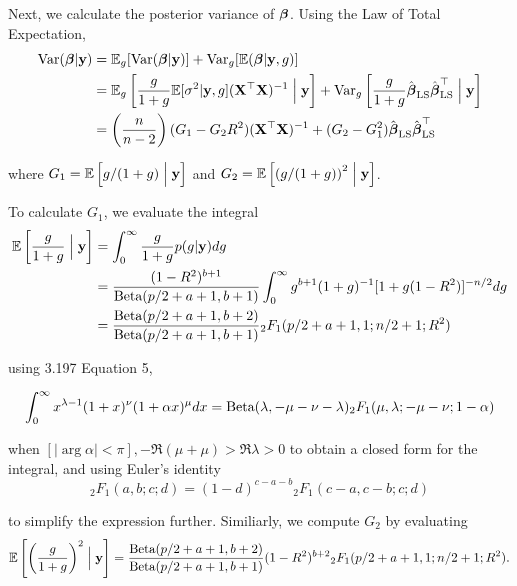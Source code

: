 \documentclass{amsart}[12pt]
\begin{document}
Next, we calculate the posterior variance of ${\boldsymbol \beta}$. Using the Law of Total Expectation,
\begin{align*}
	\text{Var}({\boldsymbol \beta} | {\bf y}) & = \mathbb{E}_g[\text{Var}({\boldsymbol \beta} | {\bf y})] + \text{Var}_g[\mathbb{E}({\boldsymbol \beta}|{\bf y}, g)]                                                                                                                                                 \\
	                   & = \mathbb{E}_g\left[\frac{g}{1 + g} \mathbb{E}[\sigma^2|{\bf y}, g] ({\bf X}^\top {\bf X})^{-1} \Bigm| {\bf y} \right] + \text{Var}_g\left[\frac{g}{1 + g} \hat{{\boldsymbol \beta}}_{\text{LS}} \hat{{\boldsymbol \beta}}_{\text{LS}}^\top \Bigm| {\bf y} \right]                                   \\
	                   & = \left( \frac{n}{n - 2} \right) (G_1 - G_2 R^2) ({\bf X}^\top {\bf X})^{-1} + (G_2 - G_1^2) \hat{{\boldsymbol \beta}}_{\text{LS}} \hat{{\boldsymbol \beta}}_{\text{LS}}^\top                                                                                      
\end{align*}

\noindent where $G_1 = \mathbb{E}\left[g/(1+g) \Bigm| {\bf y} \right]$ and $G_2 = \mathbb{E}\left[ \left(g/(1+g) \right)^2 \Bigm| {\bf y} \right]$.

\noindent To calculate $G_1$, we evaluate the integral
\begin{align*}
	\mathbb{E}\left[\frac{g}{1 + g} \Bigm| {\bf y} \right] & = \int_0^\infty \frac{g}{1 + g} p(g | {\bf y}) dg                                                                      \\
	                                           & = \frac{(1 - R^2)^{b+1}}{\text{Beta}(p/2 + a + 1, b + 1)} \int_0^\infty g^{b+1} (1 + g)^{-1} [1 + g (1 - R^2)]^{-n/2} dg \\
	                                           & = \frac{\text{Beta}(p/2 + a + 1, b + 2)}{\text{Beta}(p /2 + a + 1, b + 1)} {}_2 F_1(p/2 + a + 1, 1; n/2 + 1; R^2)              
\end{align*}

\noindent using \citep{Gradshteyn1988} 3.197 Equation 5,

\[
	\int_0^\infty x^{\lambda-1} (1+x)^\nu (1 + \alpha x)^{\mu} dx = \text{Beta}(\lambda, -\mu-\nu-\lambda) {}_2 F_1 (\mu, \lambda; -\mu-\nu; 1 - \alpha)
\]

\noindent when $[|\arg \alpha| < \pi], -\Re(\mu + \mu) > \Re \lambda > 0$ to obtain a closed form for the integral,  and
using Euler's identity
\[
	{}_2 F_1(a, b; c; d) = (1 - d)^{c - a -  b} {}_2 F_1(c - a, c - b; c; d)
\]

\noindent to simplify the expression further. Similiarly, we compute $G_2$ by evaluating
\[
	\mathbb{E}\left[ \left(\frac{g}{1 + g} \right)^2 \Bigm| {\bf y} \right] = \frac{\text{Beta}(p/2 + a + 1, b + 2)}{\text{Beta}(p /2 + a + 1, b + 1)} (1 - R^2)^{b+2} {}_2 F_1(p/2 + a + 1, 1; n/2 + 1; R^2).
\]
\end{document}
